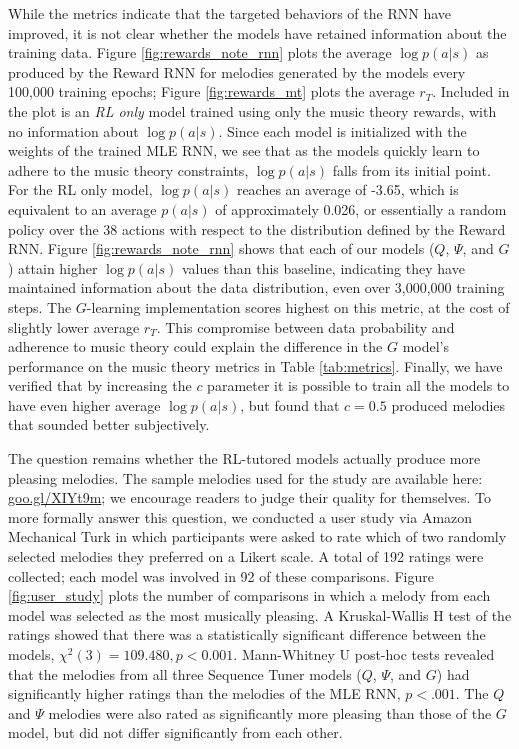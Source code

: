 While the metrics indicate that the targeted behaviors of the RNN have improved, it is not clear whether the models have retained information about the training data. Figure \ref{fig:rewards_note_rnn} plots the average $\log p(a|s)$ as produced by the Reward RNN for melodies generated by the models every 100,000 training epochs; Figure \ref{fig:rewards_mt} plots the average $r_{T}$. Included in the plot is an \emph{RL only} model trained using only the music theory rewards, with no information about $\log p(a|s)$.  Since each model is initialized with the weights of the trained MLE RNN, we see that as the models quickly learn to adhere to the music theory constraints, $\log p(a|s)$ falls from its initial point. For the RL only model, $\log p(a|s)$ reaches an average of -3.65, which is equivalent to an average $p(a|s)$ of approximately 0.026, or essentially a random policy over the 38 actions with respect to the distribution defined by the Reward RNN. Figure \ref{fig:rewards_note_rnn} shows that each of our models ($Q$, $\Psi$, and $G$) attain higher $\log p(a|s)$ values than this baseline, indicating they have maintained information about the data distribution, even over 3,000,000 training steps. The $G$-learning implementation scores highest on this metric, at the cost of slightly lower average $r_{T}$. This compromise between data probability and adherence to music theory could explain the difference in the $G$ model's performance on the music theory metrics in Table \ref{tab:metrics}. Finally, we have verified that by increasing the $c$ parameter it is possible to train all the models to have even higher average $\log p(a|s)$, but found that $c=0.5$ produced melodies that sounded better subjectively.

The question remains whether the RL-tutored models actually produce more pleasing melodies. The sample melodies used for the study are available here: \url{goo.gl/XIYt9m}; we encourage readers to judge their quality for themselves. To more formally answer this question, we conducted a user study via Amazon Mechanical Turk in which participants were asked to rate which of two randomly selected melodies they preferred on a Likert scale. A total of 192 ratings were collected; each model was involved in 92 of these comparisons. Figure \ref{fig:user_study} plots the number of comparisons in which a melody from each model was selected as the most musically pleasing. A Kruskal-Wallis H test of the ratings showed that there was a statistically significant difference between the models, $\chi^2(3)= 109.480, p<0.001$. Mann-Whitney U post-hoc tests revealed that the melodies from all three Sequence Tuner models ($Q$, $\Psi$, and $G$) had significantly higher ratings than the melodies of the MLE RNN, $p<.001$. The $Q$ and $\Psi$ melodies were also rated as significantly more pleasing than those of the $G$ model, but did not differ significantly from each other. 

